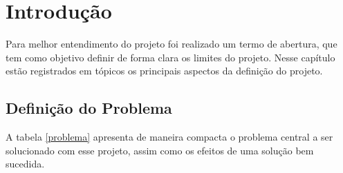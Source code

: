 \chapter[Introdução]{Introdução}
\label{chap:introducao}
	
	Para melhor entendimento do projeto foi realizado um termo de abertura, que tem como objetivo definir de forma clara os limites do projeto. Nesse capítulo estão registrados em tópicos os principais aspectos da definição do projeto.

	\section{Definição do Problema}
	\label{sec:tap_problema}

		A tabela \ref{problema} apresenta de maneira compacta o problema central a ser solucionado com esse projeto, assim como os efeitos de uma solução bem sucedida.

